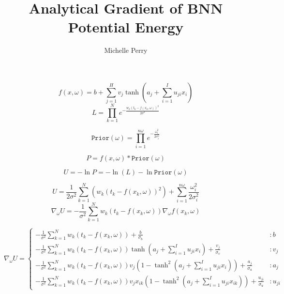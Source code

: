 \documentclass[11pt]{amsart}
\title{Analytical Gradient of BNN Potential Energy}
\author{Michelle Perry}
\begin{document}
\maketitle
\begin{equation*}
	f(x, \omega) = b + \sum_{j=1}^{H} v_j\tanh{(a_j + \sum_{i=1}^I u_{ji}x_i)}
\end{equation*}
\begin{equation*}
L = \prod_{k=1}^N e^{-\frac{w_k(t_k - f(x_k,\omega))^2}{2\sigma^2}}
\end{equation*}

\begin{equation*}
\texttt{Prior}(\omega) = \prod_{i=1}^{n\omega}e^{-\frac{\omega_i^2}{2\sigma_{i}^2}}
\end{equation*}

\begin{equation*}
	P = f(x,\omega)*\texttt{Prior}(\omega)
\end{equation*}

\begin{equation*}
	U = -\ln{P} = -\ln(L) - \ln \texttt{Prior}(\omega) 
\end{equation*}

\begin{equation*}
	U =  \frac{1}{2\sigma^2}\sum_{k=1}^N (w_k (t_k- f(x_k,\omega))^2) + \sum_{i=1}^{n\omega}\frac{\omega_i^2}{2\sigma_{i}^2}
\end{equation*}
\begin{equation*}
\nabla_{\omega}{U} = -\frac{1}{\sigma^2}\sum_{k=1}^N w_k (t_k- f(x_k,\omega))\nabla_{\omega}{f(x_k,\omega)}
\end{equation*}


\begin{equation*}
\nabla_{\omega}{U}   = \begin{cases}  -\frac{1}{\sigma^2}\sum_{k=1}^N w_k (t_k- f(x_k,\omega))+\frac{b}{\sigma_b}   &: b  \\
				 	 -\frac{1}{\sigma^2}\sum_{k=1}^N w_k (t_k- f(x_k,\omega)) \tanh{(a_j+ \sum_{i=1}^I{u_{ji}x_i})}+\frac{v_j}{\sigma_v}	 & : v_j \\
					 -\frac{1}{\sigma^2}\sum_{k=1}^N w_k (t_k- f(x_k,\omega))v_j(1-\tanh^2(a_j+\sum_{i=1}^I{u_{ji}x_i}))+\frac{a_j}{\sigma_a} & : a_j \\	 
					  -\frac{1}{\sigma^2}\sum_{k=1}^N w_k (t_k- f(x_k,\omega))v_jx_{ik}(1-\tanh^2(a_j+\sum_{i=1}^I{u_{ji}x_{ik}}))+\frac{u_{ji}}{\sigma_u} & : u_{ji} 
					 \end{cases}
\end{equation*}
\end{document}
